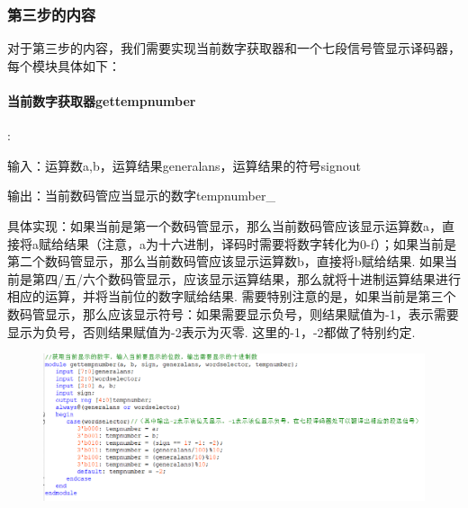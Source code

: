 \documentclass[UTF8]{ctexart}
\begin{document}
\subsubsection{第三步的内容}

对于第三步的内容，我们需要实现当前数字获取器和一个七段信号管显示译码器，每个模块具体如下：\\
\paragraph{当前数字获取器gettempnumber}:\par
输入：运算数a,b，运算结果generalans，运算结果的符号signout\par
输出：当前数码管应当显示的数字tempnumber\_\par

具体实现：如果当前是第一个数码管显示，那么当前数码管应该显示运算数a，直接将a赋给结果（注意，a为十六进制，译码时需要将数字转化为0-f）；如果当前是第二个数码管显示，那么当前数码管应该显示运算数b，直接将b赋给结果. 如果当前是第四/五/六个数码管显示，应该显示运算结果，那么就将十进制运算结果进行相应的运算，并将当前位的数字赋给结果. 需要特别注意的是，如果当前是第三个数码管显示，那么应该显示符号：如果需要显示负号，则结果赋值为-1，表示需要显示为负号，否则结果赋值为-2表示为灭零. 这里的-1，-2都做了特别约定.
\begin{figure}[H]\begin{center}
    \includegraphics[scale=1]{gettempnumber.PNG}
\end{center}\end{figure}
\end{document}
